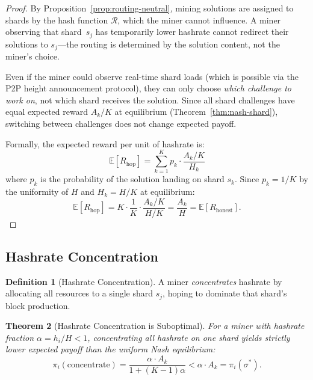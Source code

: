 \documentclass[11pt,a4paper]{article}
\newtheorem{theorem}{Theorem}[section]
\theoremstyle{definition}
\newtheorem{definition}[theorem]{Definition}
\theoremstyle{remark}
\newcommand{\payoff}{\pi}
\newcommand{\strategy}{\sigma}
\newcommand{\hashrate}{h}
\newcommand{\Hashrate}{H}
\newcommand{\reward}{R}
\newcommand{\expect}{\mathbb{E}}
\begin{document}
\begin{proof}
By Proposition~\ref{prop:routing-neutral}, mining solutions are assigned
to shards by the hash function $\mathcal{R}$, which the miner cannot
influence.
A miner observing that shard~$s_j$ has temporarily lower hashrate
cannot redirect their solutions to $s_j$---the routing is determined
by the solution content, not the miner's choice.

Even if the miner could observe real-time shard loads (which is possible
via the P2P height announcement protocol), they can only choose
\emph{which challenge to work on}, not which shard receives the solution.
Since all shard challenges have equal expected reward $A_k / K$ at
equilibrium (Theorem~\ref{thm:nash-shard}), switching between challenges
does not change expected payoff.

Formally, the expected reward per unit of hashrate is:
\[
  \expect[\reward_{\text{hop}}] = \sum_{k=1}^{K} p_k \cdot
  \frac{A_k/K}{\Hashrate_k}
\]
where $p_k$ is the probability of the solution landing on shard $s_k$.
Since $p_k = 1/K$ by the uniformity of $H$ and $\Hashrate_k = \Hashrate/K$
at equilibrium:
\[
  \expect[\reward_{\text{hop}}] = K \cdot \frac{1}{K} \cdot
  \frac{A_k/K}{\Hashrate/K} = \frac{A_k}{\Hashrate}
  = \expect[\reward_{\text{honest}}].
\]
\end{proof}

\subsection{Hashrate Concentration}

\begin{definition}[Hashrate Concentration]\label{def:concentration}
A miner \emph{concentrates} hashrate by allocating all resources to
a single shard $s_j$, hoping to dominate that shard's block production.
\end{definition}

\begin{theorem}[Hashrate Concentration is Suboptimal]\label{thm:concentration}
For a miner with hashrate fraction $\alpha = \hashrate_i / \Hashrate < 1$,
concentrating all hashrate on one shard yields strictly lower expected
payoff than the uniform Nash equilibrium:
\begin{equation}\label{eq:concentration-loss}
  \payoff_i(\text{concentrate}) = \frac{\alpha \cdot A_k}{1 + (K-1)\alpha}
  < \alpha \cdot A_k = \payoff_i(\strategy^*).
\end{equation}
\end{theorem}
\end{document}
